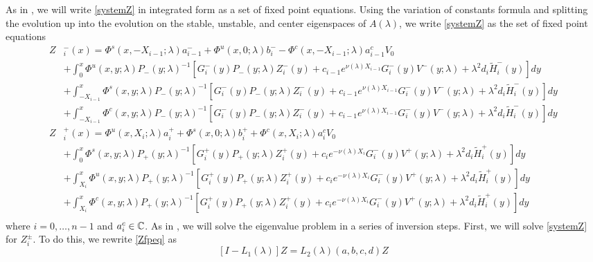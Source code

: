 \documentclass[thesis.tex]{subfiles}
\begin{document}
As in \cite{Sandstede1998}, we will write \eqref{systemZ} in integrated form as a set of fixed point equations. Using the variation of constants formula and splitting the evolution up into the evolution on the stable, unstable, and center eigenspaces of $A(\lambda)$, we write \eqref{systemZ} as the set of fixed point equations
\begin{equation}\label{Zfpeq}
\begin{aligned}
Z&_i^-(x) = \Phi^s(x, -X_{i-1}; \lambda) a_{i-1}^- + \Phi^u(x, 0; \lambda) b_i^- - \Phi^c(x, -X_{i-1}; \lambda) a_{i-1}^c V_0 \\
&+ \int_0^x \Phi^u(x, y; \lambda)P_-(y; \lambda)^{-1} [ G_i^-(y) P_-(y; \lambda)Z_i^-(y) + c_{i-1} e^{\nu(\lambda)X_{i-1}} G_i^-(y) V^-(y; \lambda) + \lambda^2 d_i \tilde{H}_i^-(y)] dy \\
&+ \int_{-X_{i-1}}^x \Phi^s(x, y; \lambda) P_-(y; \lambda)^{-1}[ G_i^-(y) P_-(y; \lambda)Z_i^-(y) + c_{i-1} e^{\nu(\lambda)X_{i-1}} G_i^-(y) V^-(y; \lambda) + \lambda^2 d_i \tilde{H}_i^-(y)] dy \\
&+ \int_{-X_{i-1}}^x \Phi^c(x, y; \lambda) P_-(y; \lambda)^{-1}[ G_i^-(y) P_-(y; \lambda)Z_i^-(y) + c_{i-1} e^{\nu(\lambda)X_{i-1}} G_i^-(y) V^-(y; \lambda) + \lambda^2 d_i \tilde{H}_i^-(y)] dy  \\ 
Z&_i^+(x) = \Phi^u(x, X_i; \lambda) a_i^+ + \Phi^s(x, 0; \lambda) b_i^+ + \Phi^c(x, X_i; \lambda) a_i^c V_0\\
&+ \int_0^x \Phi^s(x, y; \lambda) P_+(y; \lambda)^{-1} [ G_i^+(y) P_+(y; \lambda) Z_i^+(y) + c_i e^{-\nu(\lambda)X_i} G_i^-(y)V^+(y; \lambda) + \lambda^2 d_i \tilde{H}_i^+(y)] dy \\
&+ \int_{X_i}^x \Phi^u(x, y; \lambda) P_+(y; \lambda)^{-1} [ G_i^+(y) P_+(y; \lambda) Z_i^+(y) + c_i e^{-\nu(\lambda)X_i} G_i^-(y)V^+(y; \lambda) + \lambda^2 d_i \tilde{H}_i^+(y)] dy \\
&+ \int_{X_i}^x \Phi^c(x, y; \lambda) P_+(y; \lambda)^{-1} [ G_i^+(y) P_+(y; \lambda) Z_i^+(y) + c_i e^{-\nu(\lambda)X_i} G_i^-(y)V^+(y; \lambda) + \lambda^2 d_i \tilde{H}_i^+(y)] dy \\
\end{aligned}
\end{equation}
where $i = 0, \dots, n-1$ and $a_i^c \in \mathbb{C}$. As in \cite{Sandstede1998}, we will solve the eigenvalue problem in a series of inversion steps. First, we will solve \cref{systemZ} for $Z_i^\pm$. To do this, we rewrite \eqref{Zfpeq} as
\begin{equation}\label{L1L2eq}
[I - L_1(\lambda)]Z = L_2(\lambda)(a,b,c,d)Z
\end{equation}
\end{document}
